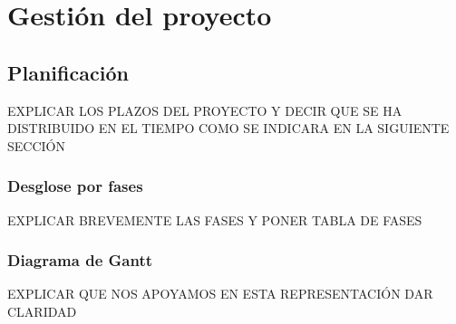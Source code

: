 \chapter{Gestión del proyecto}
\label{ch:gestion}
\section{Planificación}
EXPLICAR LOS PLAZOS DEL PROYECTO Y DECIR QUE SE HA DISTRIBUIDO EN EL TIEMPO COMO SE INDICARA EN LA SIGUIENTE SECCIÓN

\subsection{Desglose por fases}
EXPLICAR BREVEMENTE LAS FASES Y PONER TABLA DE FASES

\subsection{Diagrama de Gantt}
EXPLICAR QUE NOS APOYAMOS EN ESTA REPRESENTACIÓN DAR CLARIDAD

